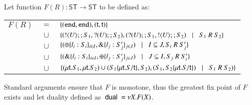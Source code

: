 \begin{definition}[Duality]
	Let function $F(R): \mathsf{ST} \longrightarrow \mathsf{ST}$ to be defined as:

	\begin{tabular}{rcl}
		$F(R)$ &$=$&		$\{(\mathtt{end}, \mathtt{end}), (\mathsf{t}, \mathsf{t})\}$\\
			&$\cup$&	$\{(! \langle U \rangle ;;S_1, ? (U) ;; S_2), (? (U) ;;S_1, ! \langle U \rangle ;; S_2) \;\;\;|\;\;\; S_1\ R\ S_2\}$\\
			&$\cup$&	$\{(\oplus \{l_i: S_i\}_{i \in I}, \& \{l_j: S_j'\}_{j \in J}) \;\;\;|\;\;\; I \subseteq J, S_i\ R\ S_j'\}$\\
			&$\cup$&	$\{(\& \{l_i: S_i\}_{i \in I}, \oplus \{l_j: S_j'\}_{j \in J}) \;\;\;|\;\;\; J \subseteq I, S_j\ R\ S_i'\}$\\
			&$\cup$&	$\{(\mu\mathsf{t}.S_1, \mu\mathsf{t}.S_2) \cup (S_1 \{\mu\mathsf{t}.S/\mathsf{t} \}, S_2), (S_1, S_2\{\mu\mathsf{t}.S/\mathsf{t} \}) \;\;\;|\;\;\; S_1\ R\ S_2)\}$
	\end{tabular}

	Standard arguments ensure that $F$ is monotone, thus the greatest fix point
	of $F$ exists and let duality defined as $\ \mathsf{dual}\  = \nu X. F(X)$.
\end{definition}
